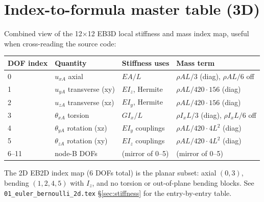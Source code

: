 \documentclass[11pt,a4paper]{book}
\begin{document}
\chapter{Index-to-formula master table (3D)}\label{app:index-master}

Combined view of the 12$\times$12 EB3D local stiffness and mass index map, useful when cross-reading the source code:

\begin{tabular}{l l l l}
\toprule
DOF index & Quantity & Stiffness uses & Mass term \\
\midrule
0 & $u_{xA}$ axial & $EA/L$ & $\rho A L / 3$ (diag), $\rho A L / 6$ off \\
1 & $u_{yA}$ transverse (xy) & $E I_z$, Hermite & $\rho A L / 420 \cdot 156$ (diag) \\
2 & $u_{zA}$ transverse (xz) & $E I_y$, Hermite & $\rho A L / 420 \cdot 156$ (diag) \\
3 & $\theta_{xA}$ torsion & $G I_x / L$ & $\rho I_x L / 3$ (diag), $\rho I_x L / 6$ off \\
4 & $\theta_{yA}$ rotation (xz) & $E I_y$ couplings & $\rho A L / 420 \cdot 4 L^2$ (diag) \\
5 & $\theta_{zA}$ rotation (xy) & $E I_z$ couplings & $\rho A L / 420 \cdot 4 L^2$ (diag) \\
6--11 & node-B DOFs & (mirror of 0--5) & (mirror of 0--5) \\
\bottomrule
\end{tabular}

\bigskip

The 2D EB2D index map (6 DOFs total) is the planar subset: axial $(0, 3)$, bending $(1, 2, 4, 5)$ with $I_z$, and no torsion or out-of-plane bending blocks. See \texttt{01\_euler\_bernoulli\_2d.tex} \S\ref{sec:stiffness} for the entry-by-entry table.
\end{document}
